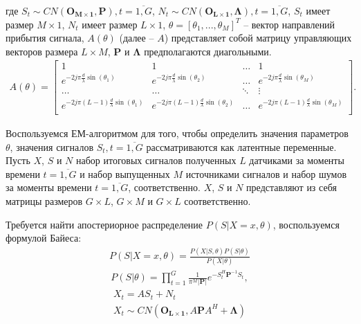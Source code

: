 \documentclass[11pt]{article}
\begin{document}
\begin{itemize}
где $S_t \sim CN(\mathbf{O_{M \times 1}},\mathbf{P}),t=\overline{1,G}$, $N_t \sim CN(\mathbf{O_{L \times 1}},\mathbf{\Lambda}), t=\overline{1,G}$, $S_t$ имеет размер $M \times 1$,  $N_t$ имеет размер $L \times 1$, $\theta=[\theta_1,...,\theta_M]^T$ -- вектор направлений прибытия сигнала, $A(\theta)$ (далее -- $A$) представляет собой матрицу управляющих векторов размера $L \times M$, $\mathbf{P}$ и $\mathbf{\Lambda}$ предполагаются диагольными.
\begin{gather}
A(\theta) = \begin{bmatrix}
1&1&\dots&1\\
e^{-2j\pi \frac{d}{\lambda}\sin(\theta_1)}& e^{-2j\pi \frac{d}{\lambda}\sin(\theta_2)}&\dots&e^{-2j\pi \frac{d}{\lambda}\sin(\theta_M)}\\
\dots&\dots&\ddots&\vdots\\
e^{-2j\pi (L-1) \frac{d}{\lambda}\sin(\theta_1)}& e^{-2j\pi (L-1) \frac{d}{\lambda}\sin(\theta_2)}&\dots&e^{-2j\pi (L-1) \frac{d}{\lambda}\sin(\theta_M)}\\
\end{bmatrix}.
\nonumber
\end{gather}
\end{itemize}
Воспользуемся ЕМ-алгоритмом для того, чтобы определить значения параметров $\theta$, значения сигналов $S_t, t=\overline{1,G}$ рассматриваются как латентные переменные. 
Пусть $X$, $S$ и $N$ набор итоговых сигналов полученных $L$ датчиками за моменты времени $t=\overline{1,G}$ и набор выпущенных $M$ источниками сигналов и набор шумов за моменты времени $t=\overline{1,G}$, соответственно. $X$, $S$ и $N$ представляют из себя матрицы размеров $G \times L$, $G \times M$ и $G \times L$ соответственно.
\begin{center}
\fontsize{16}{20}\selectfont {}
\end{center}
Требуется найти апостериорное распределение $P(S|X=x,\theta)$, воспользуемся формулой Байеса:
\begin{gather}
P(S|X=x,\theta) = \frac{P(X|S,\theta)P(S|\theta)}{P(X|\theta)}
\end{gather}
\begin{gather}
P(S|\theta) = \prod_{t=1}^G \frac{1}{\pi^M |\mathbf{P}|}e^{-S_t^H\mathbf{P}^{-1}S_t},
\end{gather}
\begin{gather*}
X_t = AS_t + N_t \\
X_t \sim CN(\mathbf{O_{L \times 1}}, A\mathbf{P} A^H + \mathbf{\Lambda})
\end{gather*}
\end{document}
